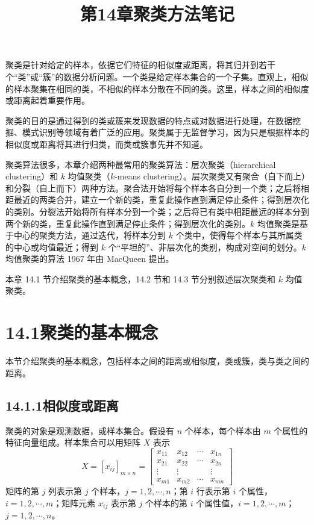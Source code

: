 \documentclass[UTF8,12pt,a4paper,fontset=fandol]{ctexart}
\title{第14章\quad 聚类方法笔记}
\author{}
\date{}
\begin{document}
\maketitle

聚类是针对给定的样本，依据它们特征的相似度或距离，将其归并到若干个“类”或“簇”的数据分析问题。一个类是给定样本集合的一个子集。直观上，相似的样本聚集在相同的类，不相似的样本分散在不同的类。这里，样本之间的相似度或距离起着重要作用。

聚类的目的是通过得到的类或簇来发现数据的特点或对数据进行处理，在数据挖掘、模式识别等领域有着广泛的应用。聚类属于无监督学习，因为只是根据样本的相似度或距离将其进行归类，而类或簇事先并不知道。

聚类算法很多，本章介绍两种最常用的聚类算法：层次聚类（hierarchical clustering）和 $k$ 均值聚类（$k$-means clustering）。层次聚类又有聚合（自下而上）和分裂（自上而下）两种方法。聚合法开始将每个样本各自分到一个类；之后将相距最近的两类合并，建立一个新的类，重复此操作直到满足停止条件；得到层次化的类别。分裂法开始将所有样本分到一个类；之后将已有类中相距最远的样本分到两个新的类，重复此操作直到满足停止条件；得到层次化的类别。$k$ 均值聚类是基于中心的聚类方法，通过迭代，将样本分到 $k$ 个类中，使得每个样本与其所属类的中心或均值最近；得到 $k$ 个“平坦的”、非层次化的类别，构成对空间的划分。$k$ 均值聚类的算法 1967 年由 MacQueen 提出。

本章 14.1 节介绍聚类的基本概念，14.2 节和 14.3 节分别叙述层次聚类和 $k$ 均值聚类。

\section*{14.1\quad 聚类的基本概念}

本节介绍聚类的基本概念，包括样本之间的距离或相似度，类或簇，类与类之间的距离。

\subsection*{14.1.1\quad 相似度或距离}

聚类的对象是观测数据，或样本集合。假设有 $n$ 个样本，每个样本由 $m$ 个属性的特征向量组成。样本集合可以用矩阵 $X$ 表示
\begin{equation}
X=[x_{ij}]_{m\times n}=
\begin{bmatrix}
x_{11} & x_{12} & \cdots & x_{1n}\\
x_{21} & x_{22} & \cdots & x_{2n}\\
\vdots & \vdots & & \vdots\\
x_{m1} & x_{m2} & \cdots & x_{mn}
\end{bmatrix}
\tag{14.1}
\end{equation}
矩阵的第 $j$ 列表示第 $j$ 个样本，$j=1,2,\cdots,n$；第 $i$ 行表示第 $i$ 个属性，$i=1,2,\cdots,m$；矩阵元素 $x_{ij}$ 表示第 $j$ 个样本的第 $i$ 个属性值，$i=1,2,\cdots,m$；$j=1,2,\cdots,n$。
\end{document}
